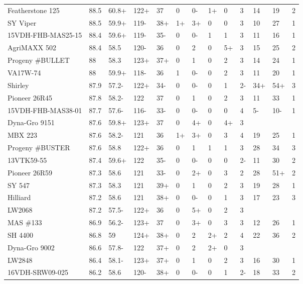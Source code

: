 \documentclass[12pt, letterpaper]{article}
\begin{document}
\begin{landscape}
\begin{ThreePartTable}
\begin{longtable}{lllllllllllll}
  Featherstone 125 & 88.5 & 60.8+ & 122+ & 37 & 0 & 0- & 1+ & 0 & 3 & 14 & 19 & 2 \\ 
  SY Viper & 88.5 & 59.9+ & 119- & 38+ & 1+ & 3+ & 0 & 0 & 3 & 10 & 27 & 1 \\ 
  15VDH-FHB-MAS25-15 & 88.4 & 59.6+ & 119- & 35- & 0 & 0- & 1 & 1 & 3 & 11 & 16 & 1 \\ 
  AgriMAXX 502 & 88.4 & 58.5 & 120- & 36 & 0 & 2 & 0 & 5+ & 3 & 15 & 25 & 2 \\ 
  Progeny \#BULLET & 88 & 58.3 & 123+ & 37+ & 0 & 1 & 0 & 2 & 3 & 14 & 24 & 1 \\ 
  VA17W-74 & 88 & 59.9+ & 118- & 36 & 1 & 0- & 0 & 2 & 3 & 11 & 20 & 1 \\ 
  Shirley & 87.9 & 57.2- & 122+ & 34- & 0 & 0- & 0 & 1 & 2- & 34+ & 54+ & 3 \\ 
  Pioneer 26R45 & 87.8 & 58.2- & 122 & 37 & 0 & 1 & 0 & 2 & 3 & 11 & 33 & 1 \\ 
  15VDH-FHB-MAS38-01 & 87.7 & 57.6- & 116- & 33- & 0 & 0- & 0 & 0 & 4 & 5- & 10- & 1 \\ 
  Dyna-Gro 9151 & 87.6 & 59.8+ & 123+ & 37 & 0 & 4+ & 0 & 4+ & 3 &  &  &  \\ 
  MBX 223 & 87.6 & 58.2- & 121 & 36 & 1+ & 3+ & 0 & 3 & 4 & 19 & 25 & 1 \\ 
  Progeny \#BUSTER & 87.6 & 58.8 & 122+ & 36 & 0 & 1 & 1 & 1 & 3 & 28 & 34 & 3 \\ 
  13VTK59-55 & 87.4 & 59.6+ & 122 & 35- & 0 & 0- & 0 & 0 & 2- & 11 & 30 & 2 \\ 
  Pioneer 26R59 & 87.3 & 58.6 & 121 & 33- & 0 & 2+ & 0 & 3 & 2 & 28 & 51+ & 2 \\ 
  SY 547 & 87.3 & 58.3 & 121 & 39+ & 0 & 1 & 0 & 2 & 3 & 19 & 28 & 1 \\ 
  Hilliard & 87.2 & 58.6 & 121 & 38+ & 0 & 0- & 0 & 1 & 3 & 17 & 23 & 3 \\ 
  LW2068 & 87.2 & 57.5- & 122+ & 36 & 0 & 5+ & 0 & 2 & 3 &  &  &  \\ 
  MAS \#133 & 86.9 & 56.2- & 123+ & 37 & 0 & 3+ & 0 & 3 & 3 & 12 & 26 & 1 \\ 
  SH 4400 & 86.8 & 59 & 124+ & 38+ & 0 & 2 & 2+ & 2 & 4 & 22 & 36 & 2 \\ 
  Dyna-Gro 9002 & 86.6 & 57.8- & 122 & 37+ & 0 & 2 & 2+ & 0 & 3 &  &  &  \\ 
  LW2848 & 86.4 & 58.1- & 123+ & 37+ & 0 & 1 & 0 & 2 & 3 & 16 & 30 & 1 \\ 
  16VDH-SRW09-025 & 86.2 & 58.6 & 120- & 38+ & 0 & 0- & 0 & 1 & 2- & 18 & 33 & 2 \\ 

\end{longtable}
\end{ThreePartTable}
\end{landscape}
\end{document}
